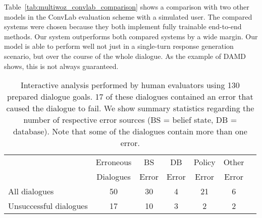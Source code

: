 \documentclass[11pt,a4paper]{article}
\begin{document}
Table~\ref{tab:multiwoz_convlab_comparison} shows a comparison with two other models in the ConvLab evaluation scheme with a simulated user. The compared systems were chosen because they both implement fully trainable end-to-end methods. Our system outperforms both compared systems by a wide margin. Our model is able to perform well not just in a single-turn response generation scenario, but over the course of the whole dialogue. As the example of DAMD shows, this is not always guaranteed.

\begin{table*}[t]
    \centering\small
    \begin{tabular}{lc|ccccc}
      \toprule
      & Erroneous & BS & DB & Policy & Other \\
      & Dialogues  & Error & Error & Error & Error \\
      \midrule
      All dialogues & 50  & 30 & 4 & 21 & 6 \\
Unsuccessful dialogues & 17 & 10 & 3 & 2 & 2 \\ 

      \bottomrule
    \end{tabular}
    \caption{Interactive  analysis performed by human evaluators using 130 prepared dialogue goals. 17 of these dialogues contained an error that caused the dialogue to fail. We show summary statistics regarding the number of respective error sources (BS = belief state, DB = database).
    Note that some of the dialogues contain more than one error.}
    \label{tab:interact_eval}
\end{table*}
\end{document}
